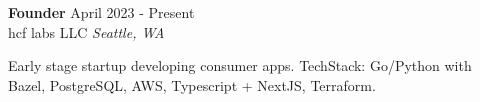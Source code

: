 \begin{mdframed}[linewidth=2,linecolor=red, innertopmargin=1em, innerbottommargin=1em, topline=false, rightline=false, bottomline=false]
    \textbf{Founder} \hfill April 2023 - Present\\
    hcf labs LLC \hfill \textit{Seattle, WA}
    
    Early stage startup developing consumer apps. TechStack: Go/Python with Bazel, PostgreSQL, AWS, Typescript + NextJS, Terraform.
\end{mdframed}